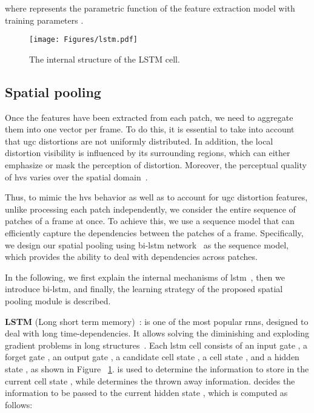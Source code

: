 \documentclass[journal]{IEEEtran}
\begin{document}
where  represents the parametric function of the feature extraction model with training parameters .

\begin{figure}[t!]
\centering
 \texttt{[image: Figures/lstm.pdf]}
\caption{The internal structure of the LSTM cell.}
\label{LSTM}\vspace{-4mm}
\end{figure}

\subsection{Spatial pooling}
Once the features have been extracted from each patch, we need to aggregate them into one vector per frame. To do this, it is essential to take into account that \ac{ugc} distortions are not uniformly distributed. In addition, the local distortion visibility is influenced by its surrounding regions, which can either emphasize or mask the perception of distortion. Moreover, the perceptual quality of \ac{hvs} varies over the spatial domain~\cite{watson1997digital}.

Thus, to mimic the \ac{hvs} behavior as well as to account for \ac{ugc} distortion features, unlike processing each patch independently, we consider the entire sequence of patches  of a frame  at once. To achieve this, we use a sequence model that can efficiently capture the dependencies between the patches of a frame. Specifically, we design our spatial pooling using \ac{bi-lstm} network~\cite{schuster1997bidirectional} as the sequence model, which provides the ability to deal with  dependencies across patches.

In the following, we first explain the internal mechanisms of \ac{lstm}~\cite{hochreiter1997long}, then we introduce \ac{bi-lstm}, and finally, the learning strategy of the proposed spatial pooling module is described.

\vspace{1mm}
\textbf{LSTM} (Long short term memory)~\cite{hochreiter1997long}: is one of the most  popular \acp{rnn},  designed to deal with long time-dependencies. It allows solving the diminishing and exploding gradient problems in  long structures~\cite{hochreiter1998vanishing}. Each \ac{lstm} cell consists of an input gate , a forget gate , an output gate , a candidate cell state , a cell state , and a hidden state , as shown in Figure
~\ref{LSTM}.  is used to determine the information to store in the current cell state , while  determines the thrown away information.  decides the information to be passed to the current hidden state , which is computed as follows:
\end{document}
